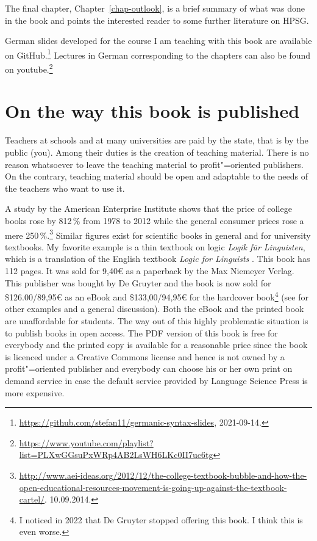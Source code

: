 
The final chapter, Chapter~\ref{chap-outlook}, is a brief summary of what was done in the book and
points the interested reader to some further literature on HPSG.

German slides developed for the course I am teaching with this book are available on GitHub.\footnote{
\url{https://github.com/stefan11/germanic-syntax-slides}, 2021-09-14.
}
Lectures in German corresponding to the chapters can also be found on youtube.\footnote{
\url{https://www.youtube.com/playlist?list=PLXwGGsuPxWRp4AB2LsWH6LKc0II7uc6tg}
}

\section*{On the way this book is published}

Teachers at schools and at many universities are paid by the state, that is by the public (you). Among
their duties is the creation of teaching material. There is no reason whatsoever to leave the
teaching material to profit"=oriented publishers. On the contrary, teaching material should be open
and adaptable to the needs of the teachers who want to use it. 

A study by the American Enterprise Institute shows that the price of college books rose by 812\,\%
from 1978 to 2012 while the general consumer prices rose a mere 250\,\%.\footnote{
\url{http://www.aei-ideas.org/2012/12/the-college-textbook-bubble-and-how-the-open-educational-resources-movement-is-going-up-against-the-textbook-cartel/}.
10.09.2014.%
} Similar figures exist for scientific books in general and for university textbooks. My favorite example is a thin textbook
on logic \emph{Logik für Linguisten}, which is a translation of the English textbook \emph{Logic for
Linguists} \citep{AAD73a}. This book has 112 pages. It was sold for 9,40€ as a paperback by the Max Niemeyer
Verlag. This publisher was bought by De Gruyter and the book is now sold for \$126.00/89,95€ as an
eBook and \$133,00/94,95€ for the hardcover book\footnote{
I noticed in 2022 that De Gruyter stopped offering this book. I think this is even worse.
} (see \citealp{MuellerOA} for other examples and a general discussion). Both the eBook and the printed book are unaffordable for students. The way out of this highly
problematic situation is to publish books in open access. The PDF version of this book is free for
everybody and the printed copy is available for a reasonable price since the book is licenced under
a Creative Commons license and hence is not owned by a
profit"=oriented publisher and everybody can choose his or her own print on demand service in case
the default service provided by Language Science Press is more expensive.

